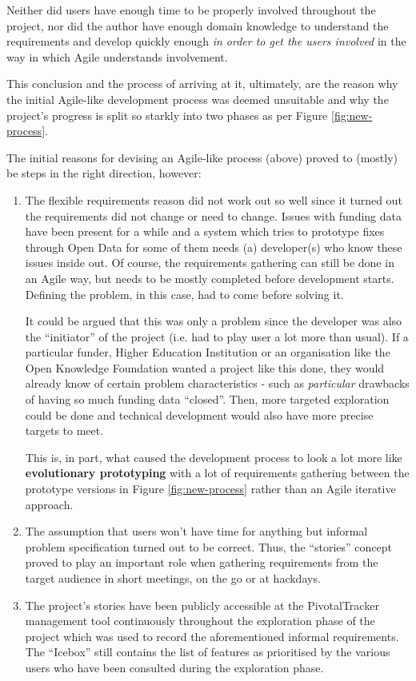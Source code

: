Neither did users have enough time to be properly involved throughout the project, nor did the author have enough domain knowledge to understand the requirements and develop quickly enough \emph{in order to get the users involved} in the way in which Agile understands involvement.

This conclusion and the process of arriving at it, ultimately, are the reason why the initial Agile-like development process was deemed unsuitable and why the project's progress is split so starkly into two phases as per Figure \ref{fig:new-process}.

The initial reasons for devising an Agile-like process (above) proved to (mostly) be steps in the right direction, however:
\begin{enumerate}
 \item The flexible requirements reason did not work out so well since it turned out the requirements did not change or need to change. Issues with funding data have been present for a while and a system which tries to prototype fixes through Open Data for some of them needs (a) developer(s) who know these issues inside out. Of course, the requirements gathering can still be done in an Agile way, but needs to be mostly completed before development starts. Defining the problem, in this case, had to come before solving it.
 
 It could be argued that this was only a problem since the developer was also the ``initiator'' of the project (i.e. had to play user a lot more than usual). If a particular funder, Higher Education Institution or an organisation like the Open Knowledge Foundation wanted a project like this done, they would already know of certain problem characteristics - such as \emph{particular} drawbacks of having so much funding data ``closed''. Then, more targeted exploration could be done and technical development would also have more precise targets to meet.
 
 This is, in part, what caused the development process to look a lot more like \textbf{evolutionary prototyping} with a lot of requirements gathering between the prototype versions in Figure \ref{fig:new-process} rather than an Agile iterative approach.
 
 \item The assumption that users won't have time for anything but informal problem specification turned out to be correct. Thus, the ``stories'' concept proved to play an important role when gathering requirements from the target audience in short meetings, on the go or at hackdays.
 
 \item The project's stories have been publicly accessible at the PivotalTracker management tool continuously throughout the exploration phase of the project which was used to record the aforementioned informal requirements. The ``Icebox'' still contains the list of features as prioritised by the various users who have been consulted during the exploration phase.
\end{enumerate}

